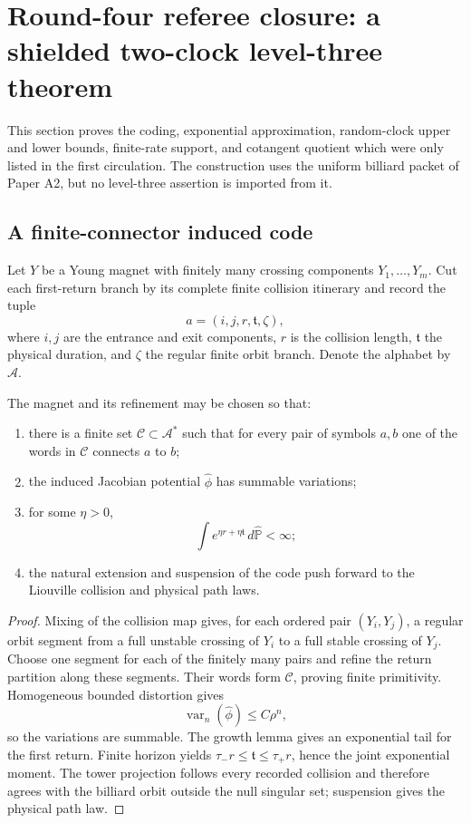 \section{Round-four referee closure: a shielded two-clock level-three theorem}
\label{sec:r3-a3}

This section proves the coding, exponential approximation, random-clock upper
and lower bounds, finite-rate support, and cotangent quotient which were only
listed in the first circulation.  The construction uses the uniform billiard
packet of Paper A2, but no level-three assertion is imported from it.

\subsection{A finite-connector induced code}

Let \(Y\) be a Young magnet with finitely many crossing components
\(Y_1,\ldots,Y_m\).  Cut each first-return branch by its complete finite
collision itinerary and record the tuple
\[
 a=(i,j,r,\mathfrak t,\zeta),
\]
where \(i,j\) are the entrance and exit components, \(r\) is the collision
length, \(\mathfrak t\) the physical duration, and \(\zeta\) the regular
finite orbit branch.  Denote the alphabet by \(\mathcal A\).

\begin{lemma}
\label{lem:r3-a3-connect}
The magnet and its refinement may be chosen so that:
\begin{enumerate}[label=(\roman*)]
\item there is a finite set \(\mathcal C\subset\mathcal A^*\) such that for
      every pair of symbols \(a,b\) one of the words in \(\mathcal C\)
      connects \(a\) to \(b\);
\item the induced Jacobian potential \(\widehat\phi\) has summable
      variations;
\item for some \(\eta>0\),
\[
 \int e^{\eta r+\eta\mathfrak t}\,d\widehat{\mathbb P}<\infty;
\]
\item the natural extension and suspension of the code push forward to the
      Liouville collision and physical path laws.
\end{enumerate}
\end{lemma}

\begin{proof}
Mixing of the collision map gives, for each ordered pair
\((Y_i,Y_j)\), a regular orbit segment from a full unstable crossing of
\(Y_i\) to a full stable crossing of \(Y_j\).  Choose one segment for each of
the finitely many pairs and refine the return partition along these segments.
Their words form \(\mathcal C\), proving finite primitivity.  Homogeneous
bounded distortion gives
\[
 \operatorname{var}_n(\widehat\phi)
 \le C\rho^n,
\]
so the variations are summable.  The growth lemma gives an exponential tail
for the first return.  Finite horizon yields
\(\tau_-r\le\mathfrak t\le\tau_+r\), hence the joint exponential moment.
The tower projection follows every recorded collision and therefore agrees
with the billiard orbit outside the null singular set; suspension gives the
physical path law.
\end{proof}

